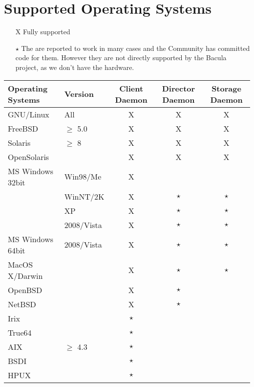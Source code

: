 
\chapter{Supported Operating Systems}
\label{SupportedOSes}

\begin{itemize}
\item[X] Fully supported
\item[$\star$] The are reported to work in many cases and the Community
   has committed code for them.  However they are
  not directly supported by the Bacula project, as we don't have the
  hardware.
\end{itemize}


\begin{tabular}[h]{|l|l|c|c|c|}
  \hline
  Operating Systems & Version & Client \small{Daemon} & Director \small{Daemon} & Storage \small{Daemon} \\
  \hline
  \hline
  GNU/Linux
  & All & X & X & X \\
  \hline
  FreeBSD & $\geq$ 5.0 & X & X & X
  \\
  \hline
  Solaris & $\geq$ 8 & X & X & X \\
  \hline
  OpenSolaris & ~ & X & X & X \\
  \hline
  \hline
  MS Windows 32bit& Win98/Me & X  & ~ & ~ \\
  \hline
  ~ & WinNT/2K & X  & $\star$ & $\star$ \\
  \hline
  ~ & XP & X  & $\star$ & $\star$ \\
  ~ & 2008/Vista & X  & $\star$ & $\star$ \\
  MS Windows 64bit& 2008/Vista & X  & $\star$ & $\star$ \\
  \hline
  \hline
  MacOS X/Darwin & ~ & X & $\star$ & $\star$ \\
  \hline
  OpenBSD & ~ & X & $\star$ & ~ \\
  \hline
  NetBSD & ~ & X & $\star$ & ~ \\
  \hline
  Irix & ~ & $\star$ & ~ & ~ \\
  \hline
  True64 & ~ & $\star$ & ~ & ~ \\
  \hline
  AIX & $\geq$ 4.3 & $\star$ & ~ & ~ \\
  \hline
  BSDI & ~ & $\star$ & ~ & ~ \\
  \hline
  HPUX & ~ & $\star$ & ~ & ~ \\
  \hline
\end{tabular}

